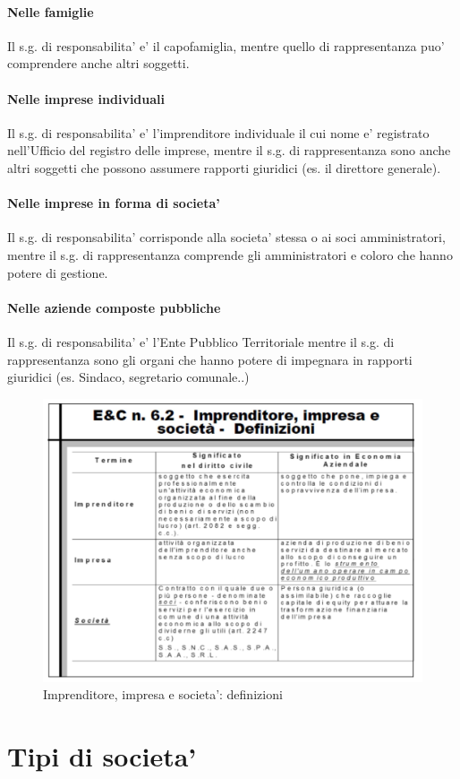 \documentclass{report}
\begin{document}
	\paragraph{Nelle famiglie}
	Il s.g. di responsabilita' e' il capofamiglia, mentre quello di rappresentanza puo' comprendere anche altri soggetti.
	\paragraph{Nelle imprese individuali}
	Il s.g. di responsabilita' e' l'imprenditore individuale il cui nome e' registrato nell'Ufficio del registro delle imprese, mentre il s.g. di rappresentanza sono anche altri soggetti che possono assumere rapporti giuridici (es. il direttore generale).
	\paragraph{Nelle imprese in forma di societa'}
	Il s.g. di responsabilita' corrisponde alla societa' stessa o ai soci amministratori, mentre il s.g. di rappresentanza comprende gli amministratori e coloro che hanno potere di gestione.
	\paragraph{Nelle aziende composte pubbliche}
	Il s.g. di responsabilita' e' l'Ente Pubblico Territoriale mentre il s.g. di rappresentanza sono gli organi che hanno potere di impegnara in rapporti giuridici (es. Sindaco, segretario comunale..)
	\begin{figure}[h]
		\centering
		\includegraphics[width=0.7\linewidth]{imprenditore-impresa-societa}
		\caption{Imprenditore, impresa e societa': definizioni}
		\label{fig:imprenditore-impresa-societa}
	\end{figure}
	\section{Tipi di societa'}
\end{document}
